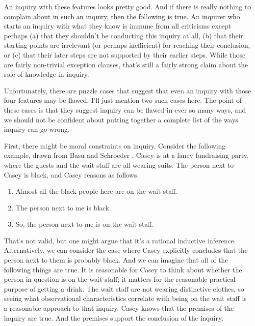 \documentclass[
  11pt,
]{book}
\providecommand{\tightlist}{%
  \setlength{\itemsep}{0pt}\setlength{\parskip}{0pt}}
\begin{document}
An inquiry with these features looks pretty good. And if there is really nothing to complain about in such an inquiry, then the following is true. An inquirer who starts an inquiry with what they know is immune from all criticisms except perhaps (a) that they shouldn't be conducting this inquiry at all, (b) that their starting points are irrelevant (or perhaps inefficient) for reaching their conclusion, or (c) that their later steps are not supported by their earlier steps. While those are fairly non-trivial exception clauses, that's still a fairly strong claim about the role of knowledge in inquiry.

Unfortunately, there are puzzle cases that suggest that even an inquiry with those four features may be flawed. I'll just mention two such cases here. The point of these cases is that they suggest inquiry can be flawed in ever so many ways, and we should not be confident about putting together a complete list of the ways inquiry can go wrong.

First, there might be moral constraints on inquiry. Consider the following example, drawn from Basu and Schroeder \citeyearpar{BasuSchroeder2019}. Casey is at a fancy fundraising party, where the guests and the wait staff are all wearing suits. The person next to Casey is black, and Casey reasons as follows.

\begin{enumerate}
\def\labelenumi{\arabic{enumi}.}
\tightlist
\item
  Almost all the black people here are on the wait staff.
\item
  The person next to me is black.
\item
  So, the person next to me is on the wait staff.
\end{enumerate}

That's not valid, but one might argue that it's a rational inductive inference. Alternatively, we can consider the case where Casey explicitly concludes that the person next to them is probably black. And we can imagine that all of the following things are true. It is reasonable for Casey to think about whether the person in question is on the wait staff; it matters for the reasonable practical purpose of getting a drink. The wait staff are not wearing distinctive clothes, so seeing what observational characteristics correlate with being on the wait staff is a reasonable approach to that inquiry. Casey knows that the premises of the inquiry are true. And the premises support the conclusion of the inquiry.
\end{document}
